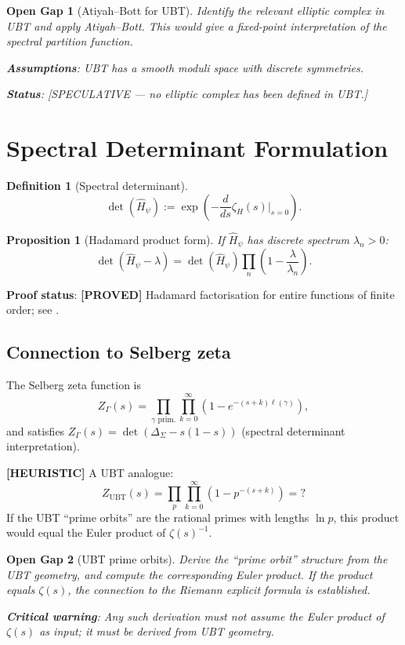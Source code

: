 \documentclass[11pt,a4paper]{article}
\newtheorem{proposition}{Proposition}
\newtheorem{definition}{Definition}
\newtheorem{gap}{Open Gap}
\newcommand{\proved}[1]{\textbf{[PROVED]} #1}
\newcommand{\heuristic}[1]{\textbf{[HEURISTIC]} #1}
\begin{document}
\begin{gap}[Atiyah--Bott for UBT]
  Identify the relevant elliptic complex in UBT and apply Atiyah--Bott.
  This would give a fixed-point interpretation of the spectral partition
  function.

  \textbf{Assumptions}: UBT has a smooth moduli space with discrete symmetries.

  \textbf{Status}: [SPECULATIVE — no elliptic complex has been defined in UBT.]
\end{gap}

\section{Spectral Determinant Formulation}

\begin{definition}[Spectral determinant]
  \[
    \det(\hat{H}_\psi) := \exp\!\left(-\frac{d}{ds}\zeta_H(s)\big|_{s=0}\right).
  \]
\end{definition}

\begin{proposition}[Hadamard product form]
  If $\hat{H}_\psi$ has discrete spectrum $\lambda_n > 0$:
  \[
    \det(\hat{H}_\psi - \lambda) = \det(\hat{H}_\psi) \prod_n \left(1 - \frac{\lambda}{\lambda_n}\right).
  \]
\end{proposition}

\textbf{Proof status}: \proved{Hadamard factorisation for entire functions of
finite order; see \cite{Levin}.}

\subsection{Connection to Selberg zeta}

The Selberg zeta function is
\[
  Z_\Gamma(s) = \prod_{\gamma \text{ prim.}} \prod_{k=0}^\infty (1 - e^{-(s+k)\ell(\gamma)}),
\]
and satisfies $Z_\Gamma(s) = \det(\Delta_\Sigma - s(1-s))$ (spectral determinant
interpretation).

\heuristic{A UBT analogue:
\[
  Z_\mathrm{UBT}(s) = \prod_p \prod_{k=0}^\infty (1 - p^{-(s+k)}) = ?
\]
If the UBT ``prime orbits'' are the rational primes with lengths $\ln p$,
this product would equal the Euler product of $\zeta(s)^{-1}$.}

\begin{gap}[UBT prime orbits]
  Derive the ``prime orbit'' structure from the UBT geometry, and compute the
  corresponding Euler product.  If the product equals $\zeta(s)$, the connection
  to the Riemann explicit formula is established.

  \textbf{Critical warning}: Any such derivation must not assume the Euler
  product of $\zeta(s)$ as input; it must be derived from UBT geometry.
\end{gap}
\end{document}
